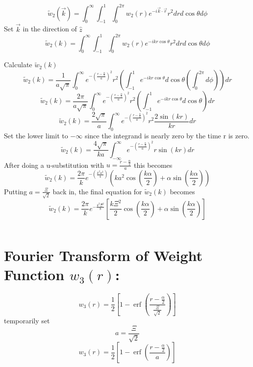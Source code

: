 \documentclass[double,12pt]{beavtex}
\begin{document}
\begin{equation}{\widetilde{w}_2(\vec{k})=\int_{0}^{\infty}\int_{-1}^{1}\int_{0}^{2\pi}w_2(r)e^{-i\vec{k}\cdot{\vec{r}}}r^2d{r}d{\cos\theta}d{\phi}}\end{equation}
Set $\vec{k}$ in the direction of $\hat{z}$ 
\begin{equation}{\widetilde{w}_2(k)=\int_{0}^{\infty}\int_{-1}^{1}\int_{0}^{2\pi}w_2(r)e^{-ikr\cos\theta}r^2d{r}d{\cos\theta}d{\phi}}\end{equation}

\noindent Calculate $\widetilde{w}_2(k)$ 
\begin{equation}{\widetilde{w}_2(k)=\frac{1}{a\sqrt{\pi}}\int_{0}^{\infty}e^{-\left(\frac{r-\frac{\alpha}{2}}{a}\right)^2}r^2\left(\int_{-1}^{1}e^{-ikr\cos\theta}d{\cos\theta}\left(\int_{0}^{2\pi}d{\phi}\right)\right)d{r}}\end{equation}
\[{}\]
\begin{equation}{\widetilde{w}_2(k)=\frac{2\pi}{a\sqrt{\pi}}\int_{0}^{\infty}e^{-\left(\frac{r-\frac{\alpha}{2}}{a}\right)^2}r^2\left(\int_{-1}^{1}e^{-ikr\cos\theta}d{\cos\theta}\right)d{r}}\end{equation}
\begin{equation}{\widetilde{w}_2(k)=\frac{2\sqrt{\pi}}{a}\int_{0}^{\infty}e^{-\left(\frac{r-\frac{\alpha}{2}}{a}\right)^2}r^2\frac{2\sin(kr)}{kr}d{r}}\end{equation}
Set the lower limit to $-\infty$  since the integrand is nearly zero by the time r is zero.
\begin{equation}{\widetilde{w}_2(k)=\frac{4\sqrt{\pi}}{ka}\int_{-\infty}^{\infty}e^{-\left(\frac{r-\frac{\alpha}{2}}{a}\right)^2}r\sin(kr)d{r}}\end{equation}
After doing a u-substitution with $u=\frac{r-\frac{\alpha}{2}}{a}$ this becomes
\begin{equation}{\widetilde{w}_2(k)=\frac{2\pi}{k}e^{-\left(\frac{k^2a^2}{4}\right)}\left(ka^2\cos\left(\frac{k\alpha}{2}\right)+\alpha\sin\left(\frac{k\alpha}{2}\right)\right)}\end{equation}
Putting $a=\frac{\Xi}{\sqrt{2}}$ back in, the final equation for $\widetilde{w}_2(k)$ becomes
\begin{equation}{\widetilde{w}_2(k)=\frac{2\pi}{k}e^{-\frac{k^2\Xi^2}{8}}\left[\frac{k\Xi^2}{2}\cos\left(\frac{k\alpha}{2}\right)+\alpha\sin\left(\frac{k\alpha}{2}\right)\right]}\end{equation}

\[{}\]
\section{Fourier Transform of Weight Function $w_{3}(r)$:}
\begin{equation}{w_3(r)=\frac{1}{2}\left[1-\operatorname{erf}\left(\frac{r-\frac{\alpha}{2}}{\frac{\Xi}{\sqrt{2}}}\right)\right]}\end{equation}
temporarily set 
\begin{equation}{a=\frac{\Xi}{\sqrt{2}}}\end{equation}
\begin{equation}{w_3(r)=\frac{1}{2}\left[1-\operatorname{erf}\left(\frac{r-\frac{\alpha}{2}}{a}\right)\right]}\end{equation}
\end{document}
